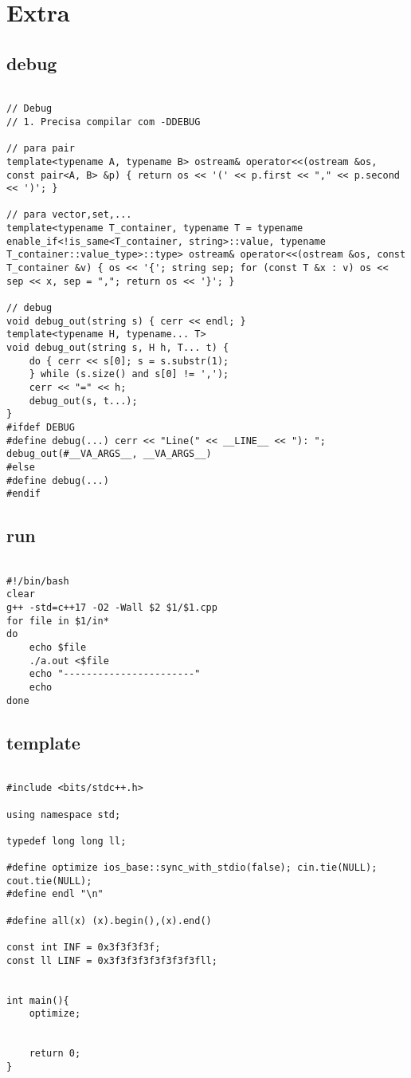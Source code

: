 \documentclass[landscape,twocolumn,10pt,a4paper]{article}
\begin{document}
\section{Extra}
\subsection{debug}
\begin{verbatim}

// Debug
// 1. Precisa compilar com -DDEBUG

// para pair
template<typename A, typename B> ostream& operator<<(ostream &os, const pair<A, B> &p) { return os << '(' << p.first << "," << p.second << ')'; }

// para vector,set,...
template<typename T_container, typename T = typename enable_if<!is_same<T_container, string>::value, typename T_container::value_type>::type> ostream& operator<<(ostream &os, const T_container &v) { os << '{'; string sep; for (const T &x : v) os << sep << x, sep = ","; return os << '}'; }

// debug
void debug_out(string s) { cerr << endl; }
template<typename H, typename... T>
void debug_out(string s, H h, T... t) {
    do { cerr << s[0]; s = s.substr(1);
    } while (s.size() and s[0] != ',');
    cerr << "=" << h;
    debug_out(s, t...);
}
#ifdef DEBUG
#define debug(...) cerr << "Line(" << __LINE__ << "): "; debug_out(#__VA_ARGS__, __VA_ARGS__)
#else
#define debug(...)
#endif\end{verbatim}

\subsection{run}
\begin{verbatim}

#!/bin/bash
clear
g++ -std=c++17 -O2 -Wall $2 $1/$1.cpp
for file in $1/in*
do
    echo $file
    ./a.out <$file
    echo "-----------------------"
    echo
done\end{verbatim}

\subsection{template}
\begin{verbatim}

#include <bits/stdc++.h>

using namespace std;

typedef long long ll;

#define optimize ios_base::sync_with_stdio(false); cin.tie(NULL); cout.tie(NULL);
#define endl "\n"

#define all(x) (x).begin(),(x).end()

const int INF = 0x3f3f3f3f;
const ll LINF = 0x3f3f3f3f3f3f3f3fll;


int main(){
    optimize;


    return 0;
}\end{verbatim}
\end{document}
